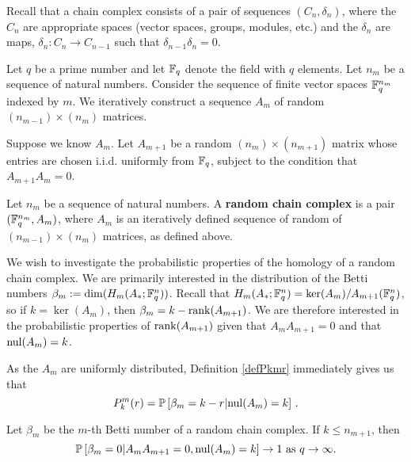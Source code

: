 Recall that a chain complex consists of a pair of sequences $(C_n, \delta_n)$, where the $C_n$ are appropriate spaces (vector spaces, groups, modules, etc.) and the $\delta_n$ are maps, $\delta_n: C_n \to C_{n-1}$ such that $\delta_{n-1}\delta_n = 0$.  

Let $q$ be a prime number and let $\mathbb{F}_q$ denote the field with $q$ elements. Let $n_m$ be a sequence of natural numbers. Consider the sequence of finite vector spaces $\mathbb{F}_q^{n_m}$ indexed by $m$.  We iteratively construct a sequence $A_m$ of random $(n_{m-1})\times (n_m)$ matrices.

Suppose we know $A_{m}$. Let $A_{m+1}$ be a random $(n_{m})\times (n_{m+1})$ matrix whose entries are chosen i.i.d. uniformly from $\mathbb{F}_q$, subject to the condition that $A_{m+1}A_{m} = 0$.

\begin{definition}
Let $n_m$ be a sequence of natural numbers. A \textbf{random chain complex} is a pair $(\mathbb{F}_q^{n_m},A_m)$, where $A_m$ is an iteratively defined sequence of random of $(n_{m-1})\times (n_m)$ matrices, as defined above.  
\end{definition}

We wish to investigate the probabilistic properties of the homology of a random chain complex.  We are primarily interested in the distribution of the Betti numbers $\beta_m := \dim(H_m(A_\ast; \mathbb{F}_q^{n}))$.  Recall that $H_m(A_\ast;\mathbb{F}_q^{n}) = \ker (A_{m})/ A_{m+1}(\mathbb{F}_q^{n})$, so if $k= \ker(A_m)$, then $\beta_m = k - \operatorname{\mathrm{rank}}(A_{m+1})$.  We are therefore interested in the probabilistic properties of $\operatorname{\mathrm{rank}}(A_{m+1})$ given that $A_{m}A_{m+1} = 0$ and that $\mathrm{nul}(A_{m}) = k$. 

\begin{remark}
As the $A_m$ are uniformly distributed, Definition \ref{defPkmr} immediately gives us that
\[
P^m_k(r) = \mathbb{P}\left[\beta_m = k-r | \mathrm{nul}(A_{m}) = k\right] \, .
\]
\end{remark}



\begin{theorem}\label{Condptoinfty}
Let $\beta_m$ be the $m$-th Betti number of a random chain complex.  If $k\leq n_{m+1}$, then
\[
\mathbb{P}\left[\beta_m=0| A_{m}A_{m+1} = 0, \mathrm{nul}(A_{m}) = k \right] \to 1 \textrm{ as } q\to\infty.
\]
\end{theorem}

